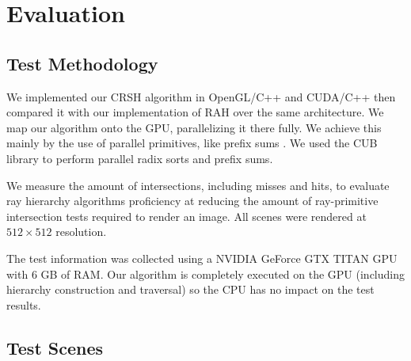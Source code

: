 
\chapter{Evaluation}
\label{chapter:evaluation}

\section{Test Methodology}
\label{section:test-methodology}

We implemented our CRSH algorithm in OpenGL/C++ and CUDA/C++ then compared it with our implementation of RAH \cite{Roger07} over the same architecture. We map our algorithm onto the GPU, parallelizing it there fully. We achieve this mainly by the use of parallel primitives, like prefix sums \cite{Blelloch90}. We used the CUB \cite{Merrill09}  \cite{Merrill11} library to perform parallel radix sorts and prefix sums.

We measure the amount of intersections, including misses and hits, to evaluate ray hierarchy algorithms proficiency at reducing the amount of ray-primitive intersection tests required to render an image. All scenes were rendered at $512\times512$ resolution.

The test information was collected using a NVIDIA GeForce GTX TITAN GPU with 6 GB of RAM. Our algorithm is completely executed on the GPU (including hierarchy construction and traversal) so the CPU has no impact on the test results.

\section{Test Scenes}
\label{section:test-scenes}

